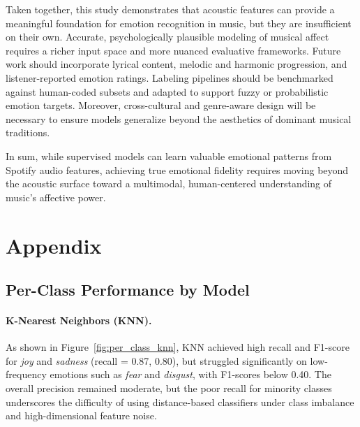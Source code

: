\documentclass{article}
\begin{document}
Taken together, this study demonstrates that acoustic features can provide a meaningful foundation for emotion recognition in music, but they are insufficient on their own. Accurate, psychologically plausible modeling of musical affect requires a richer input space and more nuanced evaluative frameworks. Future work should incorporate lyrical content, melodic and harmonic progression, and listener-reported emotion ratings. Labeling pipelines should be benchmarked against human-coded subsets and adapted to support fuzzy or probabilistic emotion targets. Moreover, cross-cultural and genre-aware design will be necessary to ensure models generalize beyond the aesthetics of dominant musical traditions.

In sum, while supervised models can learn valuable emotional patterns from Spotify audio features, achieving true emotional fidelity requires moving beyond the acoustic surface toward a multimodal, human-centered understanding of music’s affective power.


\newpage
\printbibliography

\newpage

\appendix
\section*{Appendix}

\subsection*{Per-Class Performance by Model}
\label{app:per_class_metrics}

\paragraph{K-Nearest Neighbors (KNN).}
As shown in Figure~\ref{fig:per_class_knn}, KNN achieved high recall and F1-score for \textit{joy} and \textit{sadness} (recall = 0.87, 0.80), but struggled significantly on low-frequency emotions such as \textit{fear} and \textit{disgust}, with F1-scores below 0.40. The overall precision remained moderate, but the poor recall for minority classes underscores the difficulty of using distance-based classifiers under class imbalance and high-dimensional feature noise.
\end{document}
